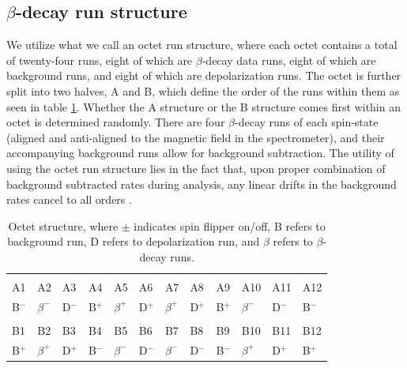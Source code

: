 \subsection{$\beta$-decay run structure}
We utilize what we call an octet run structure, where each octet contains a total of twenty-four
runs, eight of which are $\beta$-decay data runs, eight of which are background runs, and eight
of which are depolarization runs. The octet is further split into two halves, A and B, which define
the order of the runs within them as seen in table \ref{tab:octetStructure}. Whether the A structure
or the B structure comes first within an octet is determined randomly. There are four $\beta$-decay
runs of each spin-state (aligned and anti-aligned to the magnetic field in the spectrometer), and their
accompanying background runs allow for background subtraction. 
The utility of using the octet run structure lies in the fact that, upon proper combination of background
subtracted rates during analysis, any linear drifts in the background rates cancel to all orders \cite{plaster2012}.

\begin{table}[h]
  \caption{Octet structure, where $\pm$ indicates spin flipper on/off,
    B refers to background run, D refers to depolarization run, and $\beta$
    refers to $\beta$-decay runs.} 
  \centering
  \begin{tabular}{llllllllllll}
    \hline \hline \\ [-1.75ex]
    A1 & A2 & A3 & A4 & A5 & A6 & A7 & A8 & A9 & A10 & A11 & A12 \\ 
    B$^-$ & $\beta^-$ & D$^-$ & B$^+$ & $\beta^+$ & D$^+$ & $\beta^+$ & D$^+$ & B$^+$ & $\beta^-$ & D$^-$ & B$^-$ \\
    \hline \\ [-1.75ex]
    B1 & B2 & B3 & B4 & B5 & B6 & B7 & B8 & B9 & B10 & B11 & B12 \\
    B$^+$ & $\beta^+$ & D$^+$ & B$^-$ & $\beta^-$ & D$^-$ & $\beta^-$ & D$^-$ & B$^-$ & $\beta^+$ & D$^+$ & B$^+$ \\
    \hline
  \end{tabular}
  \label{tab:octetStructure}
\end{table}





